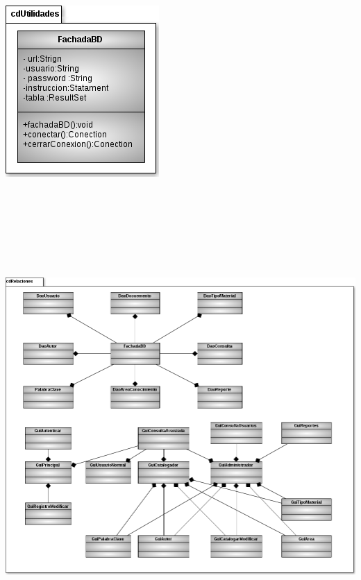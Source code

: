 \documentclass[]{article}
\begin{document}
			\begin{minipage}[c]{1\linewidth}
				\centering
				\includegraphics[scale=0.7]{DiagramasClase/Demas}
			\end{minipage}
		
			\begin{minipage}[c]{1\linewidth}
				\centering
				\includegraphics[width=17cm, height=18cm]{DiagramasClase/relaciones}
			\end{minipage}
\end{document}
